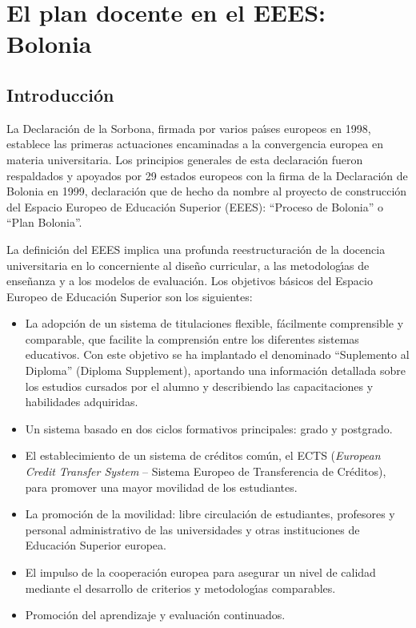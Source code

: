 
\chapter {El plan docente en el EEES: Bolonia}
\label{PD-bolonia}
\section{Introducci\'{o}n}
La Declaraci\'on de la Sorbona, firmada por varios pa\'{\i}ses europeos en 
 1998, establece las primeras actuaciones encaminadas a la
 convergencia europea en materia universitaria. Los principios generales 
de esta declaraci\'on fueron respaldados y apoyados por 29 estados europeos 
con la firma de la Declaraci\'on de Bolonia en 1999, declaraci\'on que
 de hecho da nombre al proyecto de construcci\'on del Espacio Europeo de
 Educaci\'on Superior (EEES): ``Proceso de Bolonia''  o ``Plan Bolonia''.
 



La definici\'on del EEES implica una profunda reestructuraci\'on de la 
docencia universitaria en lo concerniente al dise\~no curricular, a 
las metodolog\'{\i}as de ense\~nanza y a los modelos de evaluaci\'on.
 Los objetivos b\'asicos del Espacio Europeo de Educaci\'on Superior son
 los siguientes:



\begin{itemize}
\item La adopci\'{o}n de un sistema de titulaciones flexible, f\'{a}cilmente
comprensible y comparable, que facilite la comprensi\'{o}n entre los 
diferentes sistemas educativos. Con este objetivo se ha implantado el 
denominado ``Suplemento al Diploma'' (Diploma Supplement), 
aportando una informaci\'{o}n detallada sobre los estudios cursados 
por el alumno  y describiendo las capacitaciones y habilidades adquiridas.
\item Un sistema basado en dos ciclos formativos principales: grado y 
postgrado.
\item El establecimiento de un sistema de cr\'{e}ditos com\'{u}n, el
  ECTS ({\it European Credit Transfer System} -- Sistema Europeo de 
Transferencia de Cr\'{e}ditos), para promover una mayor 
movilidad de los estudiantes.
\item La promoci\'{o}n de la movilidad: 
libre circulaci\'{o}n de estudiantes, profesores y personal administrativo 
de las universidades y otras instituciones de Educaci\'{o}n Superior europea.
\item El impulso  de la cooperaci\'{o}n europea para asegurar un 
nivel de calidad mediante el
desarrollo de criterios y metodolog\'{\i}as comparables.
\item Promoci\'{o}n del aprendizaje y evaluaci\'{o}n continuados.
\end{itemize}


